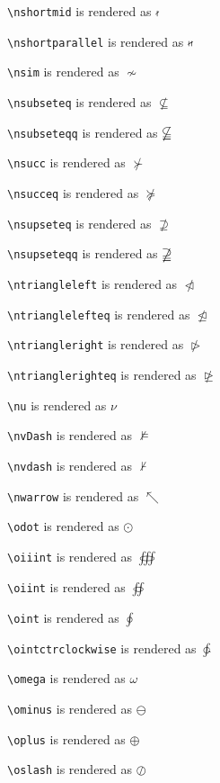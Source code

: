 \texttt{\textbackslash nshortmid} is rendered as $\nshortmid$

\texttt{\textbackslash nshortparallel} is rendered as $\nshortparallel$

\texttt{\textbackslash nsim} is rendered as $\nsim$

\texttt{\textbackslash nsubseteq} is rendered as $\nsubseteq$

\texttt{\textbackslash nsubseteqq} is rendered as $\nsubseteqq$

\texttt{\textbackslash nsucc} is rendered as $\nsucc$

\texttt{\textbackslash nsucceq} is rendered as $\nsucceq$

\texttt{\textbackslash nsupseteq} is rendered as $\nsupseteq$

\texttt{\textbackslash nsupseteqq} is rendered as $\nsupseteqq$

\texttt{\textbackslash ntriangleleft} is rendered as $\ntriangleleft$

\texttt{\textbackslash ntrianglelefteq} is rendered as $\ntrianglelefteq$

\texttt{\textbackslash ntriangleright} is rendered as $\ntriangleright$

\texttt{\textbackslash ntrianglerighteq} is rendered as $\ntrianglerighteq$

\texttt{\textbackslash nu} is rendered as $\nu$

\texttt{\textbackslash nvDash} is rendered as $\nvDash$

\texttt{\textbackslash nvdash} is rendered as $\nvdash$

\texttt{\textbackslash nwarrow} is rendered as $\nwarrow$

\texttt{\textbackslash odot} is rendered as $\odot$

\texttt{\textbackslash oiiint} is rendered as $\oiiint$

\texttt{\textbackslash oiint} is rendered as $\oiint$

\texttt{\textbackslash oint} is rendered as $\oint$

\texttt{\textbackslash ointctrclockwise} is rendered as $\ointctrclockwise$

\texttt{\textbackslash omega} is rendered as $\omega$

\texttt{\textbackslash ominus} is rendered as $\ominus$

\texttt{\textbackslash oplus} is rendered as $\oplus$

\texttt{\textbackslash oslash} is rendered as $\oslash$

